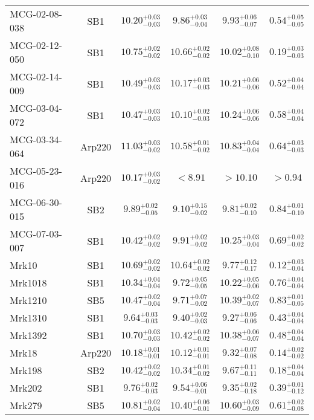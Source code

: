 \documentclass[onecolumn]{mn2e}
\begin{document}
{\begin{center}
\begin{longtable}{lccccc}
MCG-02-08-038 & SB1 & $10.20_{-0.03}^{+0.03}$ & $9.86_{-0.04}^{+0.03}$ & $9.93_{-0.07}^{+0.06}$ &$0.54_{-0.05}^{+0.05}$ \\
MCG-02-12-050 & SB1 & $10.75_{-0.02}^{+0.02}$ & $10.66_{-0.02}^{+0.02}$ & $10.02_{-0.10}^{+0.08}$ &$0.19_{-0.03}^{+0.03}$ \\
MCG-02-14-009 & SB1 & $10.49_{-0.03}^{+0.03}$ & $10.17_{-0.03}^{+0.03}$ & $10.21_{-0.06}^{+0.06}$ &$0.52_{-0.04}^{+0.04}$ \\
MCG-03-04-072 & SB1 & $10.47_{-0.03}^{+0.03}$ & $10.10_{-0.03}^{+0.02}$ & $10.24_{-0.06}^{+0.06}$ &$0.58_{-0.04}^{+0.04}$ \\
MCG-03-34-064 & Arp220 & $11.03_{-0.02}^{+0.03}$ & $10.58_{-0.02}^{+0.01}$ & $10.83_{-0.04}^{+0.04}$ &$0.64_{-0.03}^{+0.03}$ \\
MCG-05-23-016 & Arp220 & $10.17_{-0.02}^{+0.03}$ & $<8.91$ & $>10.10$ &$>0.94$ \\
MCG-06-30-015 & SB2 & $9.89_{-0.05}^{+0.02}$ & $9.10_{-0.02}^{+0.15}$ & $9.81_{-0.10}^{+0.02}$ &$0.84_{-0.10}^{+0.01}$ \\
MCG-07-03-007 & SB1 & $10.42_{-0.02}^{+0.02}$ & $9.91_{-0.02}^{+0.02}$ & $10.25_{-0.04}^{+0.03}$ &$0.69_{-0.02}^{+0.02}$ \\
Mrk10 & SB1 & $10.69_{-0.02}^{+0.02}$ & $10.64_{-0.02}^{+0.02}$ & $9.77_{-0.17}^{+0.12}$ &$0.12_{-0.04}^{+0.03}$ \\
Mrk1018 & SB1 & $10.34_{-0.04}^{+0.04}$ & $9.72_{-0.05}^{+0.05}$ & $10.22_{-0.06}^{+0.05}$ &$0.76_{-0.04}^{+0.04}$ \\
Mrk1210 & SB5 & $10.47_{-0.04}^{+0.02}$ & $9.71_{-0.02}^{+0.07}$ & $10.39_{-0.07}^{+0.02}$ &$0.83_{-0.05}^{+0.01}$ \\
Mrk1310 & SB1 & $9.64_{-0.03}^{+0.03}$ & $9.40_{-0.03}^{+0.02}$ & $9.27_{-0.06}^{+0.06}$ &$0.43_{-0.04}^{+0.04}$ \\
Mrk1392 & SB1 & $10.70_{-0.03}^{+0.03}$ & $10.42_{-0.02}^{+0.02}$ & $10.38_{-0.07}^{+0.06}$ &$0.48_{-0.04}^{+0.04}$ \\
Mrk18 & Arp220 & $10.18_{-0.01}^{+0.01}$ & $10.12_{-0.01}^{+0.01}$ & $9.32_{-0.08}^{+0.07}$ &$0.14_{-0.02}^{+0.02}$ \\
Mrk198 & SB2 & $10.42_{-0.02}^{+0.02}$ & $10.34_{-0.02}^{+0.01}$ & $9.67_{-0.11}^{+0.11}$ &$0.18_{-0.04}^{+0.04}$ \\
Mrk202 & SB1 & $9.76_{-0.03}^{+0.02}$ & $9.54_{-0.01}^{+0.06}$ & $9.35_{-0.18}^{+0.02}$ &$0.39_{-0.12}^{+0.01}$ \\
Mrk279 & SB5 & $10.81_{-0.04}^{+0.02}$ & $10.40_{-0.01}^{+0.06}$ & $10.60_{-0.09}^{+0.03}$ &$0.61_{-0.08}^{+0.02}$ \\

\end{longtable}
\end{center}}
\end{document}
